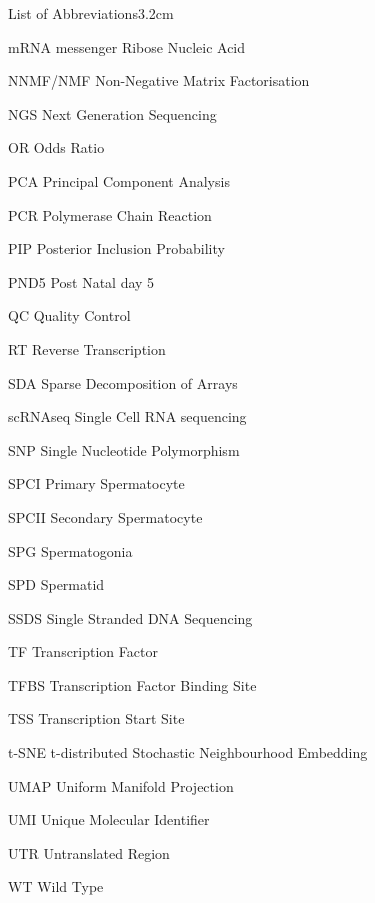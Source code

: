 \begin{mclistof}{List of Abbreviations}{3.2cm}
\item[mRNA] messenger Ribose Nucleic Acid

\item[NNMF/NMF] Non-Negative Matrix Factorisation

\item[NGS] Next Generation Sequencing

\item[OR] Odds Ratio

\item[PCA] Principal Component Analysis

\item[PCR] Polymerase Chain Reaction

\item[PIP] Posterior Inclusion Probability

\item[PND5] Post Natal day 5

\item[QC] Quality Control

\item[RT] Reverse Transcription

\item[SDA] Sparse Decomposition of Arrays

\item[scRNAseq] Single Cell RNA sequencing

\item[SNP] Single Nucleotide Polymorphism

\item[SPCI] Primary Spermatocyte

\item[SPCII] Secondary Spermatocyte

\item[SPG] Spermatogonia

\item[SPD] Spermatid

\item[SSDS] Single Stranded DNA Sequencing

\item[TF] Transcription Factor

\item[TFBS] Transcription Factor Binding Site

\item[TSS] Transcription Start Site

\item[t-SNE] t-distributed Stochastic Neighbourhood Embedding

\item[UMAP] Uniform Manifold Projection

\item[UMI] Unique Molecular Identifier

\item[UTR] Untranslated Region

\item[WT] Wild Type

\end{mclistof} 

